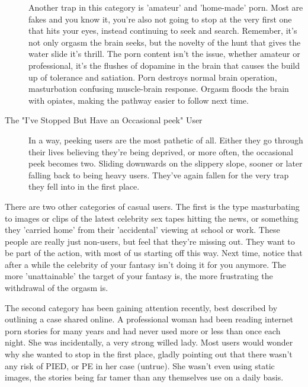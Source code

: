 \documentclass[easypeasy]{subfiles}
\begin{document}
\begin{description}
  Another trap in this category is 'amateur' and 'home-made' porn. Most are fakes and you know it, you're also not going to stop at the very first one that hits your eyes, instead continuing to seek and search. Remember, it's not only orgasm the brain seeks, but the novelty of the hunt that gives the water slide it's thrill. The porn content isn't the issue, whether amateur or professional, it's the flushes of dopamine in the brain that causes the build up of tolerance and satiation. Porn destroys normal brain operation, masturbation confusing muscle-brain response. Orgasm floods the brain with opiates, making the pathway easier to follow next time.

\item[The "I've Stopped But Have an Occasional peek" User] In a way, peeking users are the most pathetic of all. Either they go through their lives believing they're being deprived, or more often, the occasional peek becomes two. Sliding downwards on the slippery slope, sooner or later falling back to being heavy users. They've again fallen for the very trap they fell into in the first place.
 \end{description}

There are two other categories of casual users. The first is the type masturbating to images or clips of the latest celebrity sex tapes hitting the news, or something they 'carried home' from their 'accidental' viewing at school or work. These people are really just non-users, but feel that they're missing out. They want to be part of the action, with most of us starting off this way. Next time, notice that after a while the celebrity of your fantasy isn't doing it for you anymore. The more 'unattainable' the target of your fantasy is, the more frustrating the withdrawal of the orgasm is.

The second category has been gaining attention recently, best described by outlining a case shared online. A professional woman had been reading internet porn stories for many years and had never used more or less than once each night. She was incidentally, a very strong willed lady. Most users would wonder why she wanted to stop in the first place, gladly pointing out that there wasn't any risk of PIED, or PE in her case (untrue). She wasn't even using static images, the stories being far tamer than any themselves use on a daily basis.
\end{document}

